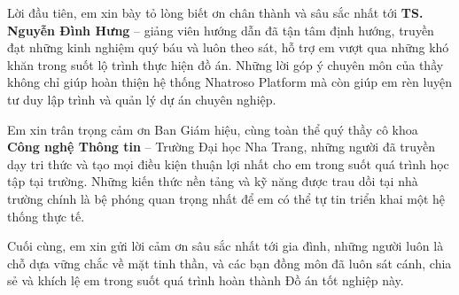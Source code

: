 \begin{acknowledgments}

Lời đầu tiên, em xin bày tỏ lòng biết ơn chân thành và sâu sắc nhất tới \textbf{TS. Nguyễn Đình Hưng} – giảng viên hướng dẫn đã tận tâm định hướng, truyền đạt những kinh nghiệm quý báu và luôn theo sát, hỗ trợ em vượt qua những khó khăn trong suốt lộ trình thực hiện đồ án. Những lời góp ý chuyên môn của thầy không chỉ giúp hoàn thiện hệ thống Nhatroso Platform mà còn giúp em rèn luyện tư duy lập trình và quản lý dự án chuyên nghiệp.

Em xin trân trọng cảm ơn Ban Giám hiệu, cùng toàn thể quý thầy cô khoa \textbf{Công nghệ Thông tin} – Trường Đại học Nha Trang, những người đã truyền dạy tri thức và tạo mọi điều kiện thuận lợi nhất cho em trong suốt quá trình học tập tại trường. Những kiến thức nền tảng và kỹ năng được trau dồi tại nhà trường chính là bệ phóng quan trọng nhất để em có thể tự tin triển khai một hệ thống thực tế.

Cuối cùng, em xin gửi lời cảm ơn sâu sắc nhất tới gia đình, những người luôn là chỗ dựa vững chắc về mặt tinh thần, và các bạn đồng môn đã luôn sát cánh, chia sẻ và khích lệ em trong suốt quá trình hoàn thành Đồ án tốt nghiệp này.

\end{acknowledgments}
\newpage
